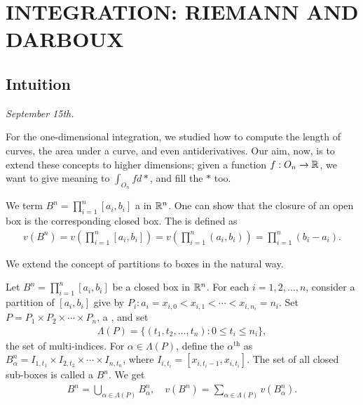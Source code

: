 \chapter{INTEGRATION: RIEMANN AND DARBOUX}

\section{Intuition}

\textit{September 15th.}

For the one-dimensional integration, we studied how to compute the length of curves, the area under a curve, and even antiderivatives. Our aim, now, is to extend these concepts to higher dimensions; given a function $f:O_{n} \to \mathbb{R}$, we want to give meaning to $\int_{O_{n}} f d\ast$, and fill the $\ast$ too.

\begin{definition}
    We term $B^{n} = \prod_{i=1}^{n} [a_{i},b_{i}]$ a  in $\mathbb{R}^{n}$. One can show that the closure of an open box is the corresponding closed box. The  is defined as
    \begin{align}
        v(B^{n}) = v\left( \prod_{i=1}^{n} [a_{i},b_{i}] \right) = v\left( \prod_{i=1}^{n} (a_{i},b_{i}) \right) = \prod_{i=1}^{n} (b_{i} - a_{i}).
    \end{align}
\end{definition}

We extend the concept of partitions to boxes in the natural way.

\begin{definition}
    Let $B^{n} = \prod_{i=1}^{n} [a_{i},b_{i}]$ be a closed box in $\mathbb{R}^{n}$. For each $i = 1,2,\ldots,n$, consider a partition of $[a_{i},b_{i}]$ give by $P_{i}:a_{i}=x_{i,0} < x_{i,1} < \cdots < x_{i,n_{i}} = n_{i}$. Set $P = P_{1} \times P_{2} \times \cdots \times P_{n}$, a , and set
    \begin{align}
        \Lambda(P) = \{(t_{1},t_{2},\ldots,t_{n}) : 0 \leq t_{i} \leq n_{i}\},
    \end{align}
    the set of multi-indices. For $\alpha \in \Lambda(P)$, define the $\alpha^{\text{th}}$  as $B_{\alpha}^{n} = I_{1,t_{1}} \times I_{2,t_{2}} \times \cdots \times I_{n,t_{n}}$, where $I_{i,t_{i}} = [x_{i,t_{i}-1}, x_{i,t_{i}}]$. The set of all closed sub-boxes is called a  $B^{n}$. We get
    \begin{align}
        B^{n} = \bigcup_{\alpha \in \Lambda(P)} B_{\alpha}^{n}, \quad v(B^{n}) = \sum_{\alpha \in \Lambda(P)} v(B_{\alpha}^{n}).
    \end{align}
\end{definition}

